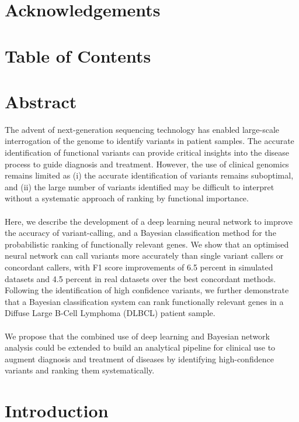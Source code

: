 \documentclass{article}
\begin{document}
\section*{Acknowledgements}
\newpage
\section*{Table of Contents}
\small
\tableofcontents
\newpage
\doublespace
\normalsize
{} 
\section*{Abstract}
The advent of next-generation sequencing technology has enabled large-scale interrogation of the genome to identify variants in patient samples. The accurate identification of functional variants can provide critical insights into the disease process to guide diagnosis and treatment. However, the use of clinical genomics remains limited as (i) the accurate identification of variants remains suboptimal, and (ii) the large number of variants identified may be difficult to interpret without a systematic approach of ranking by functional importance.\\\\
Here, we describe the development of a deep learning neural network to improve the accuracy of variant-calling, and a Bayesian classification method for the probabilistic ranking of functionally relevant genes. We show that an optimised neural network can call variants more accurately than single variant callers or concordant callers, with F1 score improvements of 6.5 percent in simulated datasets and 4.5 percent in real datasets over the best concordant methods. Following the identification of high confidence variants, we further demonstrate that a Bayesian classification system can rank functionally relevant genes in a Diffuse Large B-Cell Lymphoma (DLBCL) patient sample.\\\\ We propose that the combined use of deep learning and Bayesian network analysis could be extended to build an analytical pipeline for clinical use to augment diagnosis and treatment of diseases by identifying high-confidence variants and ranking them systematically.
\newpage
\section{Introduction}
\end{document}
